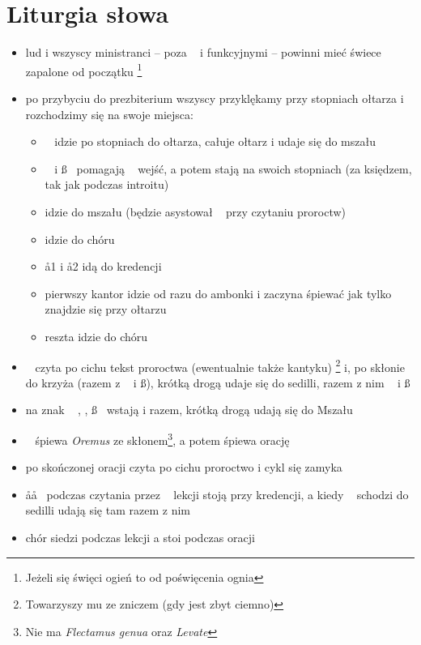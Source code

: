 \section{Liturgia słowa}

\begin{itemize}
	\item lud i wszyscy ministranci -- poza \ii~ i funkcyjnymi -- powinni mieć
	      świece zapalone od początku \footnote{Jeżeli się święci ogień to od
		      poświęcenia ognia}
	\item po przybyciu do prezbiterium wszyscy przyklękamy przy stopniach
	      ołtarza i rozchodzimy się na swoje miejsca:
	      \begin{itemize}
		      \item \ii~ idzie po stopniach do ołtarza, całuje ołtarz i udaje
		            się do mszału
		      \item \dd~ i \ss~ pomagają \ii~ wejść, a potem stają na swoich
		            stopniach (za księdzem, tak jak podczas introitu)
		      \item {} idzie do mszału (będzie asystował \ii~ przy czytaniu
		            proroctw)
		      \item {} idzie do chóru
		      \item \aa1 i \aa2 idą do kredencji
		      \item pierwszy kantor idzie od razu do ambonki i zaczyna śpiewać
		            jak tylko \ii~ znajdzie się przy ołtarzu
		      \item reszta idzie do chóru
	      \end{itemize}
	\item \ii~ czyta po cichu tekst proroctwa (ewentualnie także kantyku)
	      \footnote{Towarzyszy mu  ze zniczem (gdy jest zbyt ciemno)} i, po
	      skłonie do krzyża (razem z \dd~ i \ss), krótką drogą udaje się do
	      sedilli, razem z nim \dd~ i \ss
	\item na znak ~ \ii, \dd, \ss~ wstają i razem, krótką drogą udają się do Mszału
	\item \ii~ śpiewa \textit{Oremus} ze skłonem\footnote{Nie ma
		      \textit{Flectamus genua} oraz \textit{Levate}}, a potem śpiewa
	      orację
	\item po skończonej oracji czyta po cichu proroctwo i cykl się zamyka
	\item \aa\aa~ podczas czytania przez \ii~ lekcji stoją przy kredencji, a
	      kiedy \ii~ schodzi do sedilli udają się tam razem z nim
	\item chór siedzi podczas lekcji a stoi podczas oracji

\end{itemize}
